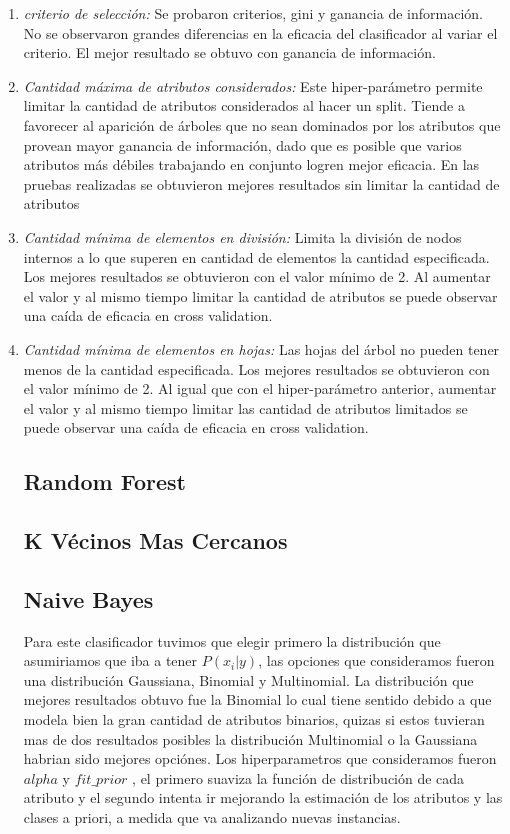  \begin{enumerate}
\item \textit{criterio de selección:} Se probaron criterios, gini y ganancia de información. No se observaron grandes diferencias en la eficacia del clasificador al variar el criterio. El mejor resultado se obtuvo con ganancia de información. 
\item \textit{Cantidad máxima de atributos considerados:} Este hiper-parámetro permite limitar la cantidad de atributos considerados al hacer un split.  Tiende a favorecer al aparición de árboles que no sean dominados por los atributos que provean mayor ganancia de información, dado que es posible que varios atributos más débiles trabajando en conjunto logren mejor eficacia. En las pruebas realizadas se obtuvieron mejores resultados sin limitar la cantidad de atributos
\item \textit{Cantidad mínima de elementos en división:} Limita la división de nodos internos a lo que superen en cantidad de elementos la cantidad especificada. Los mejores resultados se obtuvieron con el valor mínimo de 2. Al aumentar el valor y al mismo tiempo limitar la cantidad de atributos se puede observar una caída de eficacia en cross validation. 
\item \textit{Cantidad mínima de elementos en hojas:} Las hojas del árbol no pueden tener menos de la cantidad especificada. Los mejores resultados se obtuvieron con el valor mínimo de 2. Al igual que con el hiper-parámetro anterior, aumentar el valor y al mismo tiempo limitar las cantidad de atributos limitados se puede observar una caída de eficacia en cross validation.  

\subsection{Random Forest}



\subsection{K Vécinos Mas Cercanos}



\subsection{Naive Bayes}

Para este clasificador tuvimos que elegir primero la distribución que asumiriamos que iba a tener $ P(x_i | y) $, las opciones que consideramos fueron una distribución Gaussiana, Binomial y Multinomial. La distribución que mejores resultados obtuvo fue la Binomial lo cual tiene sentido debido a que modela bien la gran cantidad de atributos binarios, quizas si estos tuvieran mas de dos resultados posibles la distribución Multinomial o la Gaussiana habrian sido mejores opciónes.
Los hiperparametros que consideramos fueron $alpha$ y $fit\_prior$ , el primero suaviza la función de distribución de cada atributo y el segundo intenta ir mejorando la estimación de los atributos y las clases a priori, a medida que va analizando nuevas instancias.


\end{enumerate}
